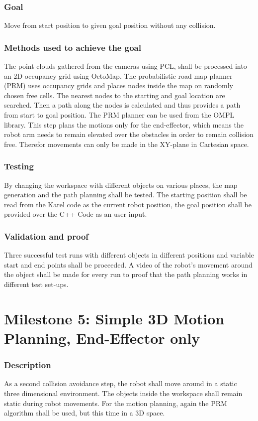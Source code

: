 \subsubsection{Goal}
Move from start position to given goal position without any collision.
\subsubsection{Methods used to achieve the goal}
The point clouds gathered from the cameras using PCL, shall be processed into an 2D occupancy grid using OctoMap. The probabilistic road map planner (PRM) uses occupancy grids and places nodes inside the map on randomly chosen free cells. The nearest nodes to the starting and goal location are searched. Then a path along the nodes is calculated and thus provides a path from start to goal position. The PRM planner can be used from the OMPL library.
This step plans the motions only for the end-effector, which means the robot arm needs to remain elevated over the obstacles in order to remain collision free. Therefor movements can only be made in the XY-plane in Cartesian space.
\subsubsection{Testing}
By changing the workspace with different objects on various places, the map generation and the path planning shall be tested. The starting position shall be read from the Karel code as the current robot position, the goal position shall be provided over the C++ Code as an user input.
\subsubsection{Validation and proof}
Three successful test runs with different objects in different positions and variable start and end points shall be proceeded.
A video of the robot's movement around the object shall be made for every run to proof that the path planning works in different test set-ups.

\section{Milestone 5: Simple 3D Motion Planning, End-Effector only}
\label{chap:mile5}
\subsubsection{Description}
As a second collision avoidance step, the robot shall move around in a static three dimensional environment. The objects inside the workspace shall remain static during robot movements. For the motion planning, again the PRM algorithm shall be used, but this time in a 3D space.
